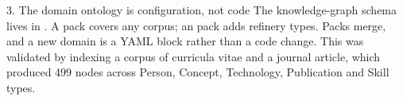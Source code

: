 \begin{keybox}{3. The domain ontology is configuration, not code}
The knowledge-graph schema lives in . A
 pack covers any corpus; an  pack adds refinery
types. Packs merge, and a new domain is a YAML block rather than a code change.
This was validated by indexing a corpus of curricula vitae and a journal
article, which produced 499 nodes across Person, Concept, Technology,
Publication and Skill types.
\end{keybox}
